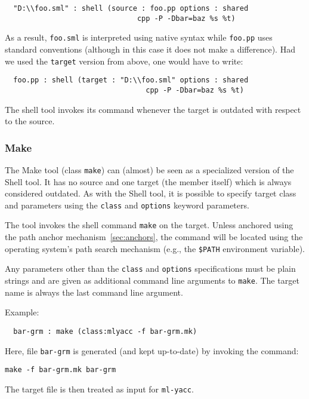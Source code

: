 \documentclass{article}
\begin{document}
\begin{verbatim}
  "D:\\foo.sml" : shell (source : foo.pp options : shared
                               cpp -P -Dbar=baz %s %t)
\end{verbatim}

\noindent As a result, {\tt foo.sml} is interpreted using native
syntax while {\tt foo.pp} uses standard conventions (although in this
case it does not make a difference).  Had we used the {\tt target}
version from above, one would have to write:

\begin{verbatim}
  foo.pp : shell (target : "D:\\foo.sml" options : shared
                                 cpp -P -Dbar=baz %s %t)
\end{verbatim}

The shell tool invokes its command whenever the target is outdated
with respect to the source.

\subsubsection*{Make}

The Make tool (class {\tt make}) can (almost) be seen as a specialized
version of the Shell tool.  It has no source and one target (the
member itself) which is always considered outdated.  As with the Shell
tool, it is possible to specify target class and parameters using the
{\tt class} and {\tt options} keyword parameters.

The tool invokes the shell command {\tt make} on the target.  Unless
anchored using the path anchor mechanism~\ref{sec:anchors}, the
command will be located using the operating system's path search
mechanism (e.g., the {\tt \$PATH} environment variable).

Any parameters other than the {\tt class} and {\tt options}
specifications must be plain strings and are given as additional
command line arguments to {\tt make}.  The target name is always the
last command line argument.

Example:

\begin{verbatim}
  bar-grm : make (class:mlyacc -f bar-grm.mk)
\end{verbatim}

Here, file {\tt bar-grm} is generated (and kept up-to-date) by
invoking the command:
\begin{verbatim}
make -f bar-grm.mk bar-grm
\end{verbatim}
\noindent The target file is then treated as input for {\tt ml-yacc}.
\end{document}
